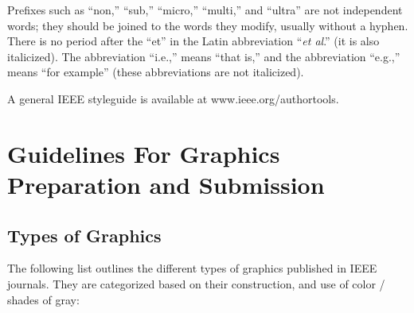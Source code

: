 \documentclass[journal]{IEEEtai}
\begin{document}
Prefixes such as ``non,'' ``sub,'' ``micro,'' ``multi,'' and ``ultra'' are not independent words; they should be joined to the words they modify, usually without a hyphen. There is no period after the ``et'' in the Latin abbreviation ``{\it et al}.'' (it is also italicized). The abbreviation ``i.e.,'' means ``that is,'' and the abbreviation ``e.g.,'' means ``for example'' (these abbreviations are not italicized).

A general IEEE styleguide is available at www.ieee.org/authortools.

\section{Guidelines For Graphics Preparation and Submission}

\subsection{Types of Graphics}

The following list outlines the different types of graphics published in IEEE journals. They are categorized based on their construction, and use of color / shades\vadjust{\pagebreak} of gray:
\end{document}

